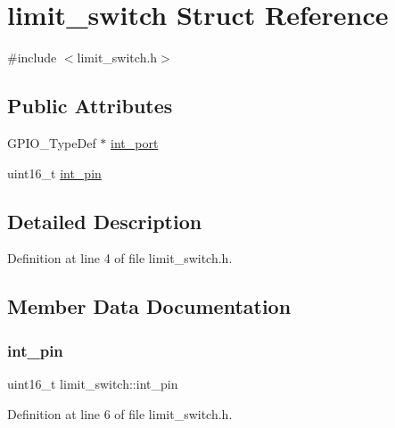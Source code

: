 \hypertarget{structlimit__switch}{}\section{limit\+\_\+switch Struct Reference}
\label{structlimit__switch}


{\ttfamily \#include $<$limit\+\_\+switch.\+h$>$}

\subsection*{Public Attributes}
\begin{DoxyCompactItemize}
\item 
G\+P\+I\+O\+\_\+\+Type\+Def $\ast$ \mbox{\hyperlink{structlimit__switch_af6b264126ee9bb617adac15907978946}{int\+\_\+port}}
\item 
uint16\+\_\+t \mbox{\hyperlink{structlimit__switch_afd7e2c4af92e7a26ee230578c98a2d67}{int\+\_\+pin}}
\end{DoxyCompactItemize}


\subsection{Detailed Description}


Definition at line 4 of file limit\+\_\+switch.\+h.



\subsection{Member Data Documentation}
\mbox{\label{structlimit__switch_afd7e2c4af92e7a26ee230578c98a2d67}} 
\subsubsection{\texorpdfstring{int\_pin}{int\_pin}}
{\footnotesize\ttfamily uint16\+\_\+t limit\+\_\+switch\+::int\+\_\+pin}



Definition at line 6 of file limit\+\_\+switch.\+h.

\mbox{\label{structlimit__switch_af6b264126ee9bb617adac15907978946}} 
